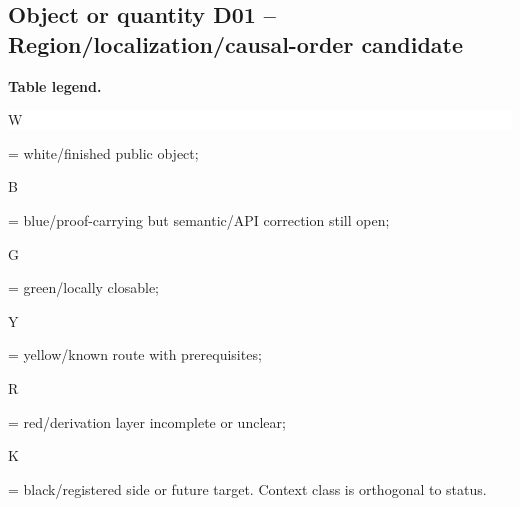 \subsection*{Object or quantity D01 -- Region/\allowbreak{}localization/\allowbreak{}causal-order candidate}
\hypertarget{objproof:D01}{}
\par\smallskip\noindent\begin{minipage}{0.99\linewidth}\footnotesize\raggedright\textbf{Table legend.} \colorbox{white}{\strut W} = white/finished public object; \colorbox{cyan!20}{\strut B} = blue/proof-carrying but semantic/API correction still open; \colorbox{green!18}{\strut G} = green/locally closable; \colorbox{yellow!25}{\strut Y} = yellow/known route with prerequisites; \colorbox{red!20}{\strut R} = red/derivation layer incomplete or unclear; \colorbox{black!18}{\strut K} = black/registered side or future target. Context class is orthogonal to status.\end{minipage}\par\vspace{0.25em}
